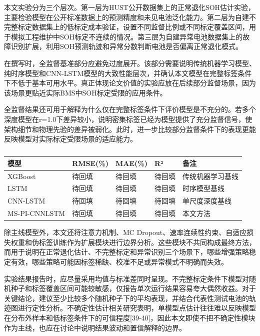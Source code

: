 \documentclass[12pt, a4paper]{ctexart}
\begin{document}
本文实验分为三个层次。第一层为HUST公开数据集上的正常退化SOH估计实验，主要检验模型在公开标准数据上的预测精度和未见电池泛化能力。第二层为自建不完整标定数据集上的低标定成本验证，设置不同监督比例或不同标定覆盖区间，用于模拟工程维护中SOH标定不连续的情况。第三层为自建异常电池数据集上的故障识别扩展，利用SOH预测轨迹和异常分数判断电池是否偏离正常退化模式。


在撰写时，全监督基准部分应避免过度展开。该部分需要说明传统机器学习模型、纯时序模型和CNN-LSTM模型的大致性能层次，并确认本文模型在完整标签条件下不低于基本可用水平。真正体现论文价值的实验应放在后续部分监督场景，因为该场景更贴近实际BMS中SOH标定受限的应用条件。


全监督结果还可用于解释为什么仅在完整标签条件下评价模型是不充分的。若多个深度模型在r=1.0下差异较小，说明密集标签已经为模型提供了充分监督信号，使架构细节和物理先验的差异被弱化。此时，进一步比较部分监督条件下的表现更能反映模型对实际标定受限场景的适应能力。




\begin{table}[H]
  \centering
  \begin{tabular}{lllll}
  \toprule
  模型 & RMSE(\%) & MAE(\%) & R² & 备注 \\
  \midrule
  XGBoost & 待回填 & 待回填 & 待回填 & 传统机器学习基线 \\
  LSTM & 待回填 & 待回填 & 待回填 & 时序模型基线 \\
  CNN-LSTM & 待回填 & 待回填 & 待回填 & 单尺度深度基线 \\
  MS-PI-CNNLSTM & 待回填 & 待回填 & 待回填 & 本文方法 \\
  \bottomrule
  \end{tabular}
  \caption{}
  \label{tab:}
\end{table}

除主线模型外，本文还将注意力机制、MC Dropout、速率连续性约束、自适应损失权重和伪标签训练作为扩展模块进行边界分析。这些模块不共同构成最终方法，而用于说明在正常退化估计、不完整标定和异常识别三个场景下，哪些增强策略稳定有效，哪些策略可能因标签稀缺、校准不足或异常模式不明确而失效。


实验结果报告时，应尽量采用均值与标准差同时呈现。不完整标定条件下模型对随机种子和标签覆盖区间可能较敏感，仅报告单次运行结果容易夸大偶然收益。对于关键结论，建议至少比较多个随机种子下的平均表现，并结合代表性测试电池的轨迹图进行定性分析。不确定性估计相关研究表明，单模型点估计往往难以反映模型在分布外样本和低标签条件下的可信程度[39-40]，因此本文即使不把不确定性模块作为主线，也应在讨论中说明结果波动和置信解释的边界。
\end{document}
